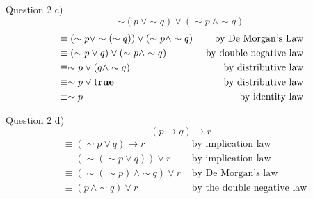\documentclass[10pt]{beamer}
\begin{document}
\begin{frame}[fragile]{Question 2}
c)
\[\sim (p \ \lor \sim q) \lor (\sim p \ \land \sim q)\]
    \begin{align*}
     &\equiv(\sim p \lor \sim (\sim q)) \lor (\sim p \land \sim q) &\text{ by De Morgan's Law} \\
     &\equiv(\sim p \lor q) \lor (\sim p \land \sim q) &\text{ by double negative law} \\
     &\equiv\sim p \lor (q \land \sim q) &\text{ by distributive law} \\
     &\equiv\sim p \lor \text{\textbf{true}} &\text{ by distributive law} \\
     &\equiv\sim p &\text{ by identity law}
    \end{align*}
\end{frame}

\begin{frame}[fragile]{Question 2}
d)
\[(p \rightarrow q) \rightarrow r\]
    \begin{align}
        &\equiv (\sim p \lor q) \rightarrow r &\text{ by implication law} \\
        &\equiv (\sim(\sim p \lor q)) \lor r &\text{ by implication law} \\
        &\equiv (\sim(\sim p) \,\land \sim q) \lor r &\text{ by De Morgan's law} \\
        &\equiv (p \,\land \sim q) \lor r &\text{ by the double negative law}
    \end{align}
\end{frame}
\end{document}
